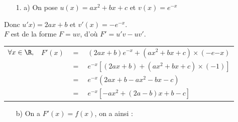 \vspace*{.3cm}

\begin{itemize}
\item[1. a)] On pose $u(x) = ax^2 + bx + c$ et $v(x) = e^{-x}$ \\
\end{itemize}

Donc $u'x) = 2ax + b$ et $v'(x) = -e^{-x}$. \\

$F$ est de la forme $F = uv$, d'où $F' = u'v - uv'$. \\

\begin{tabular}{llll}
$\forall x \in \R,$ & $F'(x)$ & $=$ & $\left(2ax + b\right)e^{-x} + \left(ax^2 + bx + c\right)\times \left(-e{-x}\right)$ \\
& & $=$ & $e^{-x}\left[\left(2ax + b\right)+\left(ax^2 + bx + c\right)\times \left(-1\right)\right]$ \\
& & $=$ & $e^{-x}\left(2ax + b - ax^2 - bx - c\right)$ \\
& & $=$ & $e^{-x}\left[-ax^2 + \left(2a-b\right)x + b - c\right]$ \\
\end{tabular}

\vspace*{.5cm}

\begin{itemize}
\item[b)] On a $F'(x) = f(x)$, on a ainsi : \\
\end{itemize}

\vspace*{-1cm}

